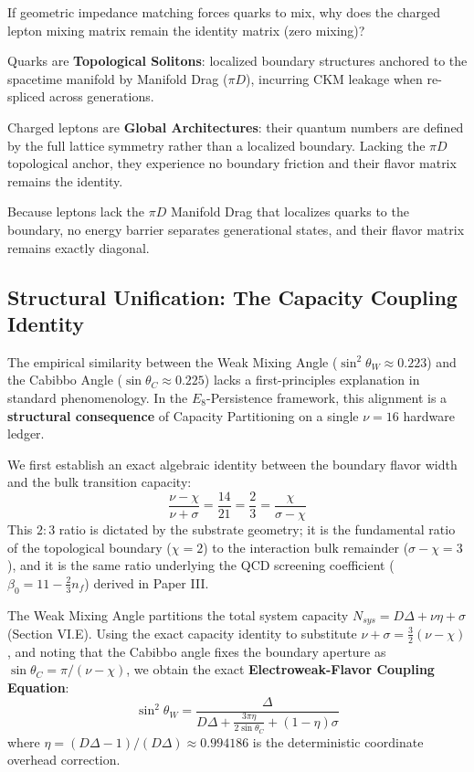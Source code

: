 If geometric impedance matching forces quarks to mix, why does the charged lepton mixing matrix remain the identity matrix (zero mixing)? 

Quarks are \textbf{Topological Solitons}: localized boundary structures anchored to the spacetime manifold by Manifold Drag ($\pi D$), incurring CKM leakage when re-spliced across generations.

Charged leptons are \textbf{Global Architectures}: their quantum numbers are defined by the full lattice symmetry rather than a localized boundary. Lacking the $\pi D$ topological anchor, they experience no boundary friction and their flavor matrix remains the identity.

Because leptons lack the $\pi D$ Manifold Drag that localizes quarks to the boundary, no energy barrier separates generational states, and their flavor matrix remains exactly diagonal.

\subsection{Structural Unification: The Capacity Coupling Identity}

The empirical similarity between the Weak Mixing Angle ($\sin^2\theta_W \approx 0.223$) and the Cabibbo Angle ($\sin\theta_C \approx 0.225$) lacks a first-principles explanation in standard phenomenology. In the $E_8$-Persistence framework, this alignment is a \textbf{structural consequence} of Capacity Partitioning on a single $\nu=16$ hardware ledger.

We first establish an exact algebraic identity between the boundary flavor width and the bulk transition capacity:
\begin{equation}
    \frac{\nu - \chi}{\nu + \sigma} = \frac{14}{21} = \frac{2}{3} = \frac{\chi}{\sigma - \chi}
\end{equation}
This $2:3$ ratio is dictated by the substrate geometry; it is the fundamental ratio of the topological boundary ($\chi=2$) to the interaction bulk remainder ($\sigma-\chi=3$), and it is the same ratio underlying the QCD screening coefficient ($\beta_0 = 11 - \frac{2}{3}n_f$) derived in Paper III.

The Weak Mixing Angle partitions the total system capacity $N_{sys} = D\Delta + \nu\eta + \sigma$ (Section VI.E). Using the exact capacity identity to substitute $\nu + \sigma = \frac{3}{2}(\nu - \chi)$, and noting that the Cabibbo angle fixes the boundary aperture as $\sin\theta_C = \pi/(\nu - \chi)$, we obtain the exact \textbf{Electroweak-Flavor Coupling Equation}:
\begin{equation}
    \sin^2\theta_W = \frac{\Delta}{D\Delta + \frac{3\pi\eta}{2\sin\theta_C} + (1-\eta)\sigma}
\end{equation}
where $\eta = (D\Delta-1)/(D\Delta) \approx 0.994186$ is the deterministic coordinate overhead correction.


